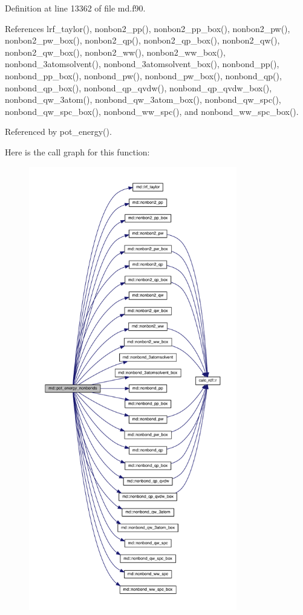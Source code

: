 Definition at line 13362 of file md.\-f90.



References lrf\-\_\-taylor(), nonbon2\-\_\-pp(), nonbon2\-\_\-pp\-\_\-box(), nonbon2\-\_\-pw(), nonbon2\-\_\-pw\-\_\-box(), nonbon2\-\_\-qp(), nonbon2\-\_\-qp\-\_\-box(), nonbon2\-\_\-qw(), nonbon2\-\_\-qw\-\_\-box(), nonbon2\-\_\-ww(), nonbon2\-\_\-ww\-\_\-box(), nonbond\-\_\-3atomsolvent(), nonbond\-\_\-3atomsolvent\-\_\-box(), nonbond\-\_\-pp(), nonbond\-\_\-pp\-\_\-box(), nonbond\-\_\-pw(), nonbond\-\_\-pw\-\_\-box(), nonbond\-\_\-qp(), nonbond\-\_\-qp\-\_\-box(), nonbond\-\_\-qp\-\_\-qvdw(), nonbond\-\_\-qp\-\_\-qvdw\-\_\-box(), nonbond\-\_\-qw\-\_\-3atom(), nonbond\-\_\-qw\-\_\-3atom\-\_\-box(), nonbond\-\_\-qw\-\_\-spc(), nonbond\-\_\-qw\-\_\-spc\-\_\-box(), nonbond\-\_\-ww\-\_\-spc(), and nonbond\-\_\-ww\-\_\-spc\-\_\-box().



Referenced by pot\-\_\-energy().



Here is the call graph for this function\-:
\nopagebreak
\begin{figure}[H]
\begin{center}
\leavevmode
\includegraphics[height=550pt]{classmd_abbebc653c402962d37a907f58296668e_cgraph}
\end{center}
\end{figure}




